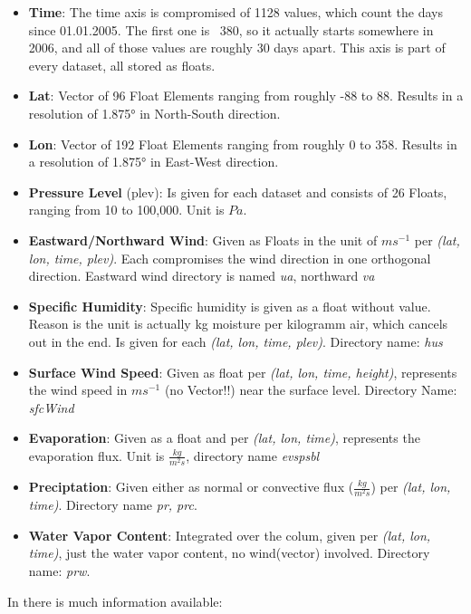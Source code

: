\begin{itemize}
  \item \textbf{Time}: The time axis is  compromised of 1128 values, which count the days since 01.01.2005. The first one is ~380, so it actually starts somewhere in 2006, and all of those values are roughly 30 days apart. This axis is part of every dataset, all stored as floats.
  \item \textbf{Lat}: Vector of 96 Float Elements ranging from roughly -88 to 88. Results in a resolution of 1.875° in North-South direction.
  \item \textbf{Lon}: Vector of 192 Float Elements ranging from roughly 0 to 358. Results in a resolution of 1.875° in East-West direction. 
  \item \textbf{Pressure Level} (plev): Is given for each dataset and consists of 26 Floats, ranging from 10 to 100,000. Unit is $Pa$.
  \item \textbf{Eastward/Northward Wind}: Given as Floats in the unit of $ms^{-1}$ per \textit{(lat, lon, time, plev)}. Each compromises the wind direction in one orthogonal direction. Eastward wind directory is named \textit{ua}, northward \textit{va}  
  \item \textbf{Specific Humidity}: Specific humidity is given as a float without value. Reason is the unit is actually kg moisture per kilogramm air, which cancels out in the end. Is given for each \textit{(lat, lon, time, plev)}. Directory name: \textit{hus}
  \item \textbf{Surface Wind Speed}: Given as float per \textit{(lat, lon, time, height)}, represents the wind speed in $ms^{-1}$ (no Vector!!) near the surface level. Directory Name: \textit{sfcWind}
  \item \textbf{Evaporation}: Given as a float and per \textit{(lat, lon, time)}, represents the evaporation flux. Unit is $\frac{kg}{m^2s}$, directory name \textit{evspsbl}
  \item \textbf{Preciptation}: Given either as normal or convective flux ($\frac{kg}{m^2s}$) per \textit{(lat, lon, time)}. Directory name \textit{pr, prc}.
  \item \textbf{Water Vapor Content}: Integrated over the colum, given per \textit{(lat, lon, time)}, just the water vapor content, no wind(vector) involved. Directory name: \textit{prw}.
	
\end{itemize}



In \cite{mpige} there is much information available:




